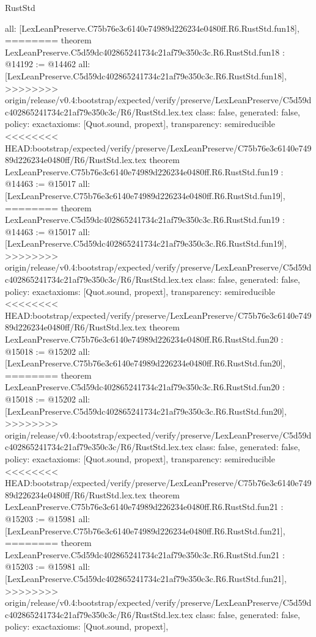 \begin{lexlean}{RustStd}
\begin{coremodule}
{\begin{coremodule}
{{{{{{{{{{{{{{{{{{{{{  all: [LexLeanPreserve.C75b76e3c6140e74989d226234e0480ff.R6.RustStd.fun18],
========
theorem LexLeanPreserve.C5d59dc402865241734c21af79e350c3c.R6.RustStd.fun18 : @14192 := @14462 {
  all: [LexLeanPreserve.C5d59dc402865241734c21af79e350c3c.R6.RustStd.fun18],
>>>>>>>> origin/release/v0.4:bootstrap/expected/verify/preserve/LexLeanPreserve/C5d59dc402865241734c21af79e350c3c/R6/RustStd.lex.tex
  class: false,
  generated: false,
  policy: exact{axioms: [Quot.sound, propext]},
  transparency: semireducible
}
<<<<<<<< HEAD:bootstrap/expected/verify/preserve/LexLeanPreserve/C75b76e3c6140e74989d226234e0480ff/R6/RustStd.lex.tex
theorem LexLeanPreserve.C75b76e3c6140e74989d226234e0480ff.R6.RustStd.fun19 : @14463 := @15017 {
  all: [LexLeanPreserve.C75b76e3c6140e74989d226234e0480ff.R6.RustStd.fun19],
========
theorem LexLeanPreserve.C5d59dc402865241734c21af79e350c3c.R6.RustStd.fun19 : @14463 := @15017 {
  all: [LexLeanPreserve.C5d59dc402865241734c21af79e350c3c.R6.RustStd.fun19],
>>>>>>>> origin/release/v0.4:bootstrap/expected/verify/preserve/LexLeanPreserve/C5d59dc402865241734c21af79e350c3c/R6/RustStd.lex.tex
  class: false,
  generated: false,
  policy: exact{axioms: [Quot.sound, propext]},
  transparency: semireducible
}
<<<<<<<< HEAD:bootstrap/expected/verify/preserve/LexLeanPreserve/C75b76e3c6140e74989d226234e0480ff/R6/RustStd.lex.tex
theorem LexLeanPreserve.C75b76e3c6140e74989d226234e0480ff.R6.RustStd.fun20 : @15018 := @15202 {
  all: [LexLeanPreserve.C75b76e3c6140e74989d226234e0480ff.R6.RustStd.fun20],
========
theorem LexLeanPreserve.C5d59dc402865241734c21af79e350c3c.R6.RustStd.fun20 : @15018 := @15202 {
  all: [LexLeanPreserve.C5d59dc402865241734c21af79e350c3c.R6.RustStd.fun20],
>>>>>>>> origin/release/v0.4:bootstrap/expected/verify/preserve/LexLeanPreserve/C5d59dc402865241734c21af79e350c3c/R6/RustStd.lex.tex
  class: false,
  generated: false,
  policy: exact{axioms: [Quot.sound, propext]},
  transparency: semireducible
}
<<<<<<<< HEAD:bootstrap/expected/verify/preserve/LexLeanPreserve/C75b76e3c6140e74989d226234e0480ff/R6/RustStd.lex.tex
theorem LexLeanPreserve.C75b76e3c6140e74989d226234e0480ff.R6.RustStd.fun21 : @15203 := @15981 {
  all: [LexLeanPreserve.C75b76e3c6140e74989d226234e0480ff.R6.RustStd.fun21],
========
theorem LexLeanPreserve.C5d59dc402865241734c21af79e350c3c.R6.RustStd.fun21 : @15203 := @15981 {
  all: [LexLeanPreserve.C5d59dc402865241734c21af79e350c3c.R6.RustStd.fun21],
>>>>>>>> origin/release/v0.4:bootstrap/expected/verify/preserve/LexLeanPreserve/C5d59dc402865241734c21af79e350c3c/R6/RustStd.lex.tex
  class: false,
  generated: false,
  policy: exact{axioms: [Quot.sound, propext]},
}}}}}}}}}}}}}}}}}}}}}}}}}
\end{coremodule}}
\end{coremodule}
\end{lexlean}
